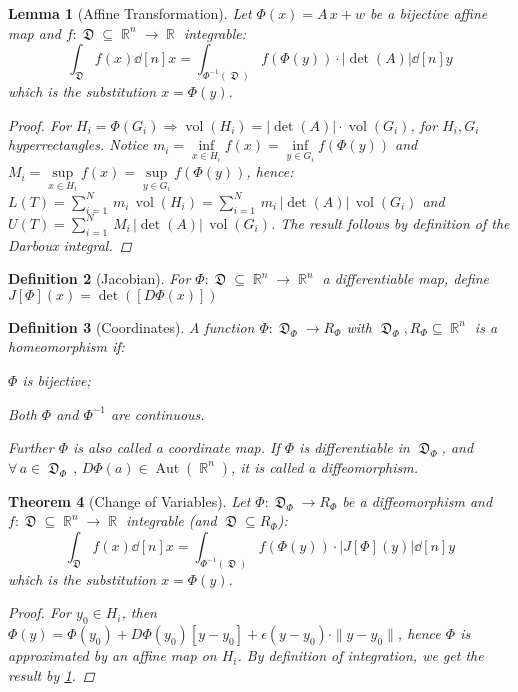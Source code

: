 \documentclass[12pt]{article}
\let\RA\Rightarrow
\let\ee\epsilon
\newcommand{\Forall}[1]{\forall\,{#1}\,,\,}
\DeclareMathOperator{\R}{\mathbb{R}}
\DeclareMathOperator{\D}{\mathfrak{D}}
\DeclareMathOperator{\Aut}{Aut}
\DeclareMathOperator{\vol}{vol}
\newtheorem{theorem}{Theorem}[subsection]
\newtheorem{definition}[theorem]{Definition}
\newtheorem{lemma}[theorem]{Lemma}
\begin{document}
\begin{lemma}[Affine Transformation]
  \label{affine_jacobian}
  Let $\Phi(x)=A\,x+w$ be a bijective affine map and $f:\D\subseteq\R^n\to\R$ integrable:
  $$\int_{\D} f(x)\dd[n]{x}=\int_{\Phi^{-1}(\D)} f(\Phi(y))\cdot|\det(A)|\dd[n]{y}$$ which is the substitution $x=\Phi(y)$.
  \begin{proof}
    For $H_i=\Phi(G_i)\RA \vol(H_i)=|\det(A)|\cdot\vol(G_i)$, for $H_i,G_i$ hyperrectangles. Notice $m_i=\inf\limits_{x\in H_i}f(x)=\inf\limits_{y\in G_i}f(\Phi(y))$ and $M_i=\sup\limits_{x\in H_i}f(x)=\sup\limits_{y\in G_i}f(\Phi(y))$, hence: $\displaystyle L(T)=\sum_{i=1}^{N}\,m_i\,\vol(H_i)=\sum_{i=1}^{N}\,m_i\,|\det(A)|\,\vol(G_i)$ and $\displaystyle U(T)=\sum_{i=1}^{N}\,M_i\,|\det(A)|\,\vol(G_i)$. The result follows by definition of the Darboux integral.
  \end{proof}
\end{lemma}

\begin{definition}[Jacobian]
  For $\Phi:\D\subseteq\R^n\to\R^n$ a differentiable map, define $J[\Phi](x)=\det([D\Phi(x)])$
\end{definition}

\begin{definition}[Coordinates]
  A function $\Phi:\D_\Phi\to R_\Phi$ with $\D_\Phi,R_\Phi\subseteq \R^n$ is a homeomorphism if:
  \begin{compactitem}
    \item $\Phi$ is bijective;
    \item Both $\Phi$ and $\Phi^{-1}$ are continuous.
  \end{compactitem}
  Further $\Phi$ is also called a coordinate map. If $\Phi$ is differentiable in $\D_\Phi$, and $\Forall{a\in\D_\Phi}D\Phi(a)\in\Aut(\R^n)$, it is called a diffeomorphism.
\end{definition}

\begin{theorem}[Change of Variables]
  \label{change_of_vars}
  Let $\Phi:\D_\Phi\to R_\Phi$ be a diffeomorphism and $f:\D\subseteq\R^n\to\R$ integrable (and $\D\subseteq R_\Phi$):
  $$\int_{\D} f(x)\dd[n]{x}=\int_{\Phi^{-1}(\D)} f(\Phi(y))\cdot|J[\Phi](y)|\dd[n]{y}$$ which is the substitution $x=\Phi(y)$.
  \begin{proof}
    For $y_0\in H_i$, then $\Phi(y)=\Phi(y_0)+D\Phi(y_0)[y-y_0]+\ee(y-y_0)\cdot\|y-y_0\|$, hence $\Phi$ is approximated by an affine map on $H_i$. By definition of integration, we get the result by \ref{affine_jacobian}.
  \end{proof}
\end{theorem}
\end{document}
